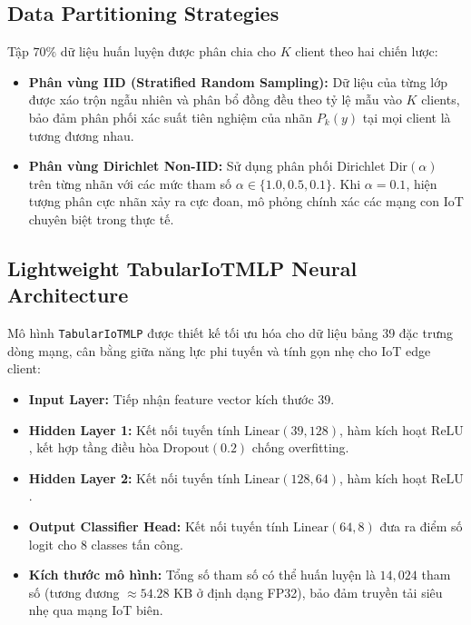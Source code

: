 \subsection{Data Partitioning Strategies}
Tập $70\%$ dữ liệu huấn luyện được phân chia cho $K$ client theo hai chiến lược:
\begin{itemize}
    \item \textbf{Phân vùng IID (Stratified Random Sampling):} Dữ liệu của từng lớp được xáo trộn ngẫu nhiên và phân bổ đồng đều theo tỷ lệ mẫu vào $K$ clients, bảo đảm phân phối xác suất tiên nghiệm của nhãn $P_k(y)$ tại mọi client là tương đương nhau.
    \item \textbf{Phân vùng Dirichlet Non-IID:} Sử dụng phân phối Dirichlet $\text{Dir}(\alpha)$ trên từng nhãn với các mức tham số $\alpha \in \{1.0, 0.5, 0.1\}$. Khi $\alpha = 0.1$, hiện tượng phân cực nhãn xảy ra cực đoan, mô phỏng chính xác các mạng con IoT chuyên biệt trong thực tế.
\end{itemize}

\subsection{Lightweight TabularIoTMLP Neural Architecture}
Mô hình \texttt{TabularIoTMLP} được thiết kế tối ưu hóa cho dữ liệu bảng 39 đặc trưng dòng mạng, cân bằng giữa năng lực phi tuyến và tính gọn nhẹ cho IoT edge client:
\begin{itemize}
    \item \textbf{Input Layer:} Tiếp nhận feature vector kích thước $39$.
    \item \textbf{Hidden Layer 1:} Kết nối tuyến tính $\text{Linear}(39, 128)$, hàm kích hoạt $\text{ReLU}$, kết hợp tầng điều hòa $\text{Dropout}(0.2)$ chống overfitting.
    \item \textbf{Hidden Layer 2:} Kết nối tuyến tính $\text{Linear}(128, 64)$, hàm kích hoạt $\text{ReLU}$.
    \item \textbf{Output Classifier Head:} Kết nối tuyến tính $\text{Linear}(64, 8)$ đưa ra điểm số logit cho 8 classes tấn công.
    \item \textbf{Kích thước mô hình:} Tổng số tham số có thể huấn luyện là $14,024$ tham số (tương đương $\approx 54.28\text{ KB}$ ở định dạng FP32), bảo đảm truyền tải siêu nhẹ qua mạng IoT biên.
\end{itemize}

